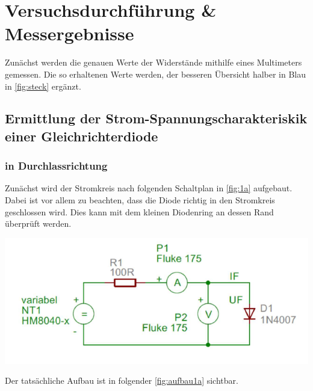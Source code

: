 \documentclass[11pt,ngerman]{scrartcl}
\begin{document}
\newpage

\section{Versuchsdurchführung \& Messergebnisse}\label{sec:Versuchsdurchführung}

Zunächst werden die genauen Werte der Widerstände mithilfe eines Multimeters gemessen. Die so erhaltenen Werte werden, der besseren Übersicht halber in Blau in \autoref{fig:steck} ergänzt.

\subsection{Ermittlung der Strom-Spannungscharakteriskik einer Gleichrichterdiode}

\subsubsection{in Durchlassrichtung}

Zunächst wird der Stromkreis nach folgenden Schaltplan in \autoref{fig:1a}
aufgebaut. Dabei ist vor allem zu beachten, dass die Diode richtig in den
Stromkreis geschlossen wird. Dies kann mit dem kleinen Diodenring an dessen
Rand überprüft werden.

\begin{center}
	\begin{minipage}[t]{0.7\textwidth}
		\includegraphics[width=\textwidth]{skizze_1a}
		\label{fig:1a}
	\end{minipage}
\end{center}

\noindent Der tatsächliche Aufbau ist in folgender \autoref{fig:aufbau1a} sichtbar.
\end{document}
